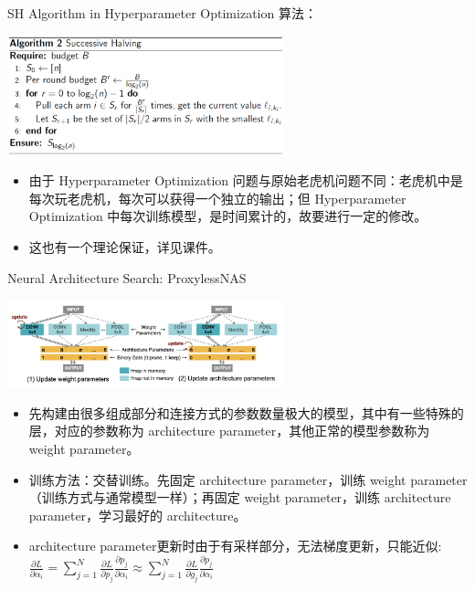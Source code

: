 \begin{frame}{SH Algorithm in Hyperparameter Optimization}
    算法：
    \begin{center}
        \includegraphics[width=0.6\textwidth]{assets/sh2.png}
    \end{center}
    \begin{itemize}
        \item 由于 Hyperparameter Optimization 问题与原始老虎机问题不同：老虎机中是每次玩老虎机，每次可以获得一个独立的输出；但 Hyperparameter Optimization 中每次训练模型，是时间累计的，故要进行一定的修改。
        \item 这也有一个理论保证，详见课件。
    \end{itemize}
\end{frame}

\begin{frame}{Neural Architecture Search: ProxylessNAS}
    \begin{center}
        \includegraphics[width=0.6\textwidth]{assets/plnas.png}
    \end{center}
    \begin{itemize}
        \item 先构建由很多组成部分和连接方式的参数数量极大的模型，其中有一些特殊的层，对应的参数称为 architecture parameter，其他正常的模型参数称为 weight parameter。
        \item 训练方法：交替训练。先固定 architecture parameter，训练 weight parameter（训练方式与通常模型一样）；再固定 weight parameter，训练 architecture parameter，学习最好的 architecture。
        \item architecture parameter更新时由于有采样部分，无法梯度更新，只能近似: $\frac{\partial L}{\partial \alpha_i} = \sum_{j=1}^{N} \frac{\partial L}{\partial p_j}\frac{\partial p_j}{\partial \alpha_i} \approx \sum_{j=1}^{N} \frac{\partial L}{\partial g_j}\frac{\partial p_j}{\partial \alpha_i}$
    \end{itemize}
\end{frame}
